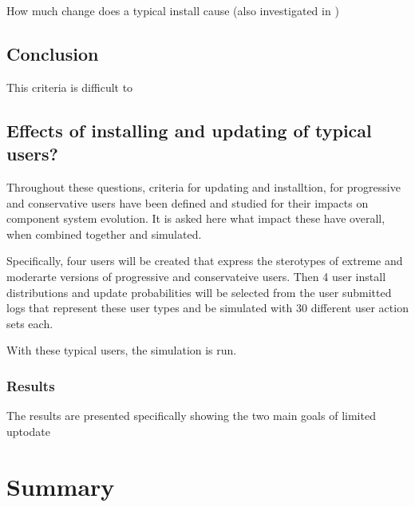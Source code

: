 How much change does a typical install cause (also investigated in \cite{Jenson2010})

\subsection{Conclusion}
This criteria is difficult to 

\subsection{Effects of installing and updating of typical users?}
Throughout these questions, criteria for updating and installtion, for progressive and conservative users have been defined and studied for their impacts on component system evolution.
It is asked here what impact these have overall, when combined together and simulated.

Specifically, four users will be created that express the sterotypes of extreme and moderarte versions of progressive and conservateive users.
Then 4 user install distributions and update probabilities will be selected from the user submitted logs that represent these user types and be simulated with 30 different user action sets each.

With these typical users, the simulation is run.
\subsubsection{Results}
The results are presented specifically showing the two main goals of limited uptodate

\section{Summary}
